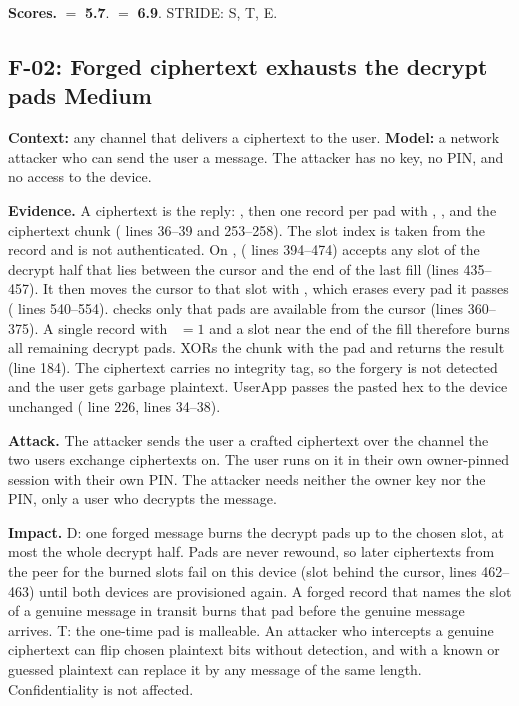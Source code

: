 \documentclass[11pt,a4paper]{article}
\newcommand{\sev}[1]{\textbf{#1}}
\begin{document}
\textbf{Scores.}  $=$ \textbf{5.7}.  $=$ \textbf{6.9}. STRIDE: S, T, E.

\subsection*{F-02: Forged ciphertext exhausts the decrypt pads \hfill \sev{Medium}}\label{f:F-02}
\textbf{Context:} any channel that delivers a ciphertext to the user. \textbf{Model:} a network attacker who can send the user a message. The attacker has no key, no PIN, and no access to the device.

\textbf{Evidence.} A ciphertext is the  reply: , then one record per pad with , , and the ciphertext chunk ( lines 36--39 and 253--258). The slot index is taken from the record and is not authenticated. On ,  ( lines 394--474) accepts any slot of the decrypt half that lies between the cursor and the end of the last fill (lines 435--457). It then moves the cursor to that slot with , which erases every pad it passes ( lines 540--554).  checks only that  pads are available from the cursor (lines 360--375). A single record with ~$=1$ and a slot near the end of the fill therefore burns all remaining decrypt pads.  XORs the chunk with the pad and returns the result (line 184). The ciphertext carries no integrity tag, so the forgery is not detected and the user gets garbage plaintext. UserApp passes the pasted hex to the device unchanged ( line 226,  lines 34--38).

\textbf{Attack.} The attacker sends the user a crafted ciphertext over the channel the two users exchange ciphertexts on. The user runs  on it in their own owner-pinned session with their own PIN. The attacker needs neither the owner key nor the PIN, only a user who decrypts the message.

\textbf{Impact.} D: one forged message burns the decrypt pads up to the chosen slot, at most the whole decrypt half. Pads are never rewound, so later ciphertexts from the peer for the burned slots fail on this device (slot behind the cursor, lines 462--463) until both devices are provisioned again. A forged record that names the slot of a genuine message in transit burns that pad before the genuine message arrives. T: the one-time pad is malleable. An attacker who intercepts a genuine ciphertext can flip chosen plaintext bits without detection, and with a known or guessed plaintext can replace it by any message of the same length. Confidentiality is not affected.
\end{document}
